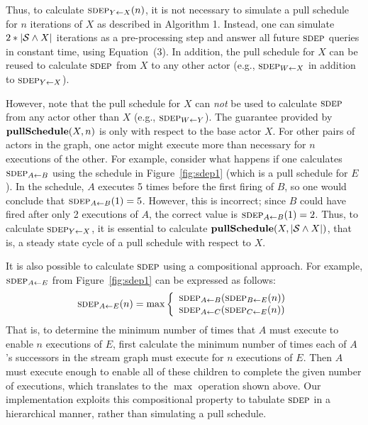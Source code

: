 


Thus, to calculate $\sdepf{Y}{X}(n)$, it is not necessary to simulate
a pull schedule for $n$ iterations of $X$ as described in Algorithm 1.
Instead, one can simulate $2 * |{\cal S} \wedge X|$ iterations as a
pre-processing step and answer all future $\textsc{sdep}$ queries in constant
time, using Equation~(3).  In addition, the pull schedule for $X$ can
be reused to calculate $\textsc{sdep}$ from $X$ to any other actor (e.g.,
$\sdepf{W}{X}$ in addition to $\sdepf{Y}{X}$).

However, note that the pull schedule for $X$ can {\it not} be used to
calculate $\textsc{sdep}$ from any actor other than $X$ (e.g.,
$\sdepf{W}{Y}$).  The guarantee provided by ${\bf pullSchedule}(X, n)$
is only with respect to the base actor $X$. For other pairs of actors
in the graph, one actor might execute more than necessary for $n$
executions of the other.  For example, consider what happens if one
calculates $\sdepf{A}{B}$ using the schedule in Figure~\ref{fig:sdep1}
(which is a pull schedule for $E$).  In the schedule, $A$ executes 5
times before the first firing of $B$, so one would conclude that
$\sdepf{A}{B}(1) = 5$.  However, this is incorrect; since $B$ could
have fired after only 2 executions of $A$, the correct value is
$\sdepf{A}{B}(1) = 2$.  Thus, to calculate $\sdepf{Y}{X}$, it is
essential to calculate ${\bf pullSchedule}(X, |{\cal S} \wedge X|)$,
that is, a steady state cycle of a pull schedule with respect to $X$.

It is also possible to calculate $\textsc{sdep}$ using a compositional
approach.  For example, $\sdepf{A}{E}$ from Figure~\ref{fig:sdep1} can
be expressed as follows:
\begin{equation*}
\begin{array}{rl}
\sdepf{A}{E}(n) = \max \left\{\begin{array}{l}
\sdepf{A}{B} ( \sdepf{B}{E}(n) ) \\
\sdepf{A}{C} ( \sdepf{C}{E}(n) )
\end{array}\right.
\end{array}
\end{equation*}
That is, to determine the minimum number of times that $A$ must
execute to enable $n$ executions of $E$, first calculate the minimum
number of times each of $A$'s successors in the stream graph must
execute for $n$ executions of $E$.  Then $A$ must execute enough to
enable all of these children to complete the given number of
executions, which translates to the $\max$ operation shown above.  Our
implementation exploits this compositional property to tabulate
$\textsc{sdep}$ in a hierarchical manner, rather than simulating a pull
schedule.

